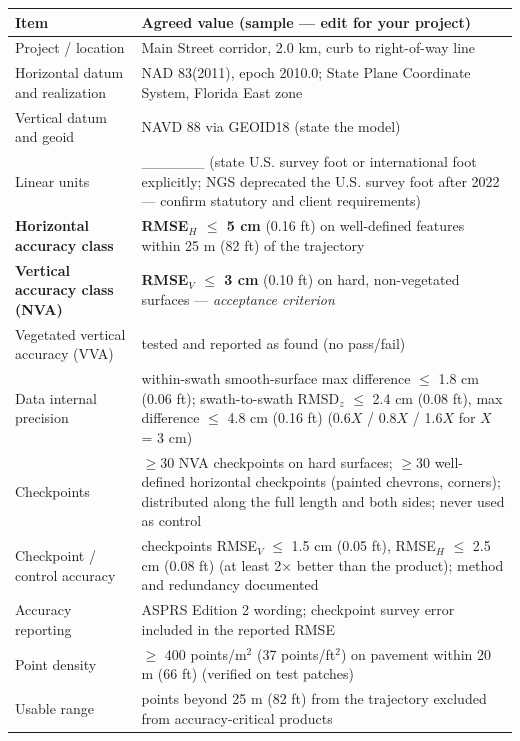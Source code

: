 \begin{center}\small
\renewcommand{\arraystretch}{1.3}
\begin{tabularx}{\linewidth}{>{\raggedright\arraybackslash}p{5.0cm}X}\toprule
\textbf{Item} & \textbf{Agreed value (sample --- edit for your project)}\\\midrule
Project / location & Main Street corridor, 2.0 km, curb to right-of-way line\\
Horizontal datum and realization & NAD 83(2011), epoch 2010.0; State Plane Coordinate System, Florida East zone\\
Vertical datum and geoid & NAVD 88 via GEOID18 (state the model)\\
Linear units & \_\_\_\_\_\_ (state U.S. survey foot or international foot explicitly; NGS deprecated the U.S. survey foot after 2022 --- confirm statutory and client requirements)\\
\textbf{Horizontal accuracy class} & \textbf{RMSE$_H$ $\le$ 5 cm} (0.16 ft) on well-defined features within 25 m (82 ft) of the trajectory\\
\textbf{Vertical accuracy class (NVA)} & \textbf{RMSE$_V$ $\le$ 3 cm} (0.10 ft) on hard, non-vegetated surfaces --- \emph{acceptance criterion}\\
Vegetated vertical accuracy (VVA) & tested and reported as found (no pass/fail)\\
Data internal precision & within-swath smooth-surface max difference $\le$ 1.8 cm (0.06 ft); swath-to-swath RMSD$_z$ $\le$ 2.4 cm (0.08 ft), max difference $\le$ 4.8 cm (0.16 ft) (0.6$X$ / 0.8$X$ / 1.6$X$ for $X$ = 3 cm)\\
Checkpoints & $\ge$30 NVA checkpoints on hard surfaces; $\ge$30 well-defined horizontal checkpoints (painted chevrons, corners); distributed along the full length and both sides; never used as control\\
Checkpoint / control accuracy & checkpoints RMSE$_V$ $\le$ 1.5 cm (0.05 ft), RMSE$_H$ $\le$ 2.5 cm (0.08 ft) (at least 2$\times$ better than the product); method and redundancy documented\\
Accuracy reporting & ASPRS Edition 2 wording; checkpoint survey error included in the reported RMSE\\
Point density & $\ge$ 400 points/m$^2$ (37 points/ft$^2$) on pavement within 20 m (66 ft) (verified on test patches)\\
Usable range & points beyond 25 m (82 ft) from the trajectory excluded from accuracy-critical products\\

\end{tabularx}
\end{center}
